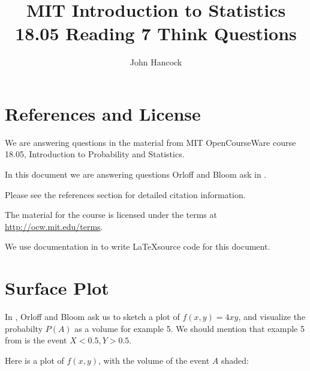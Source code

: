 \documentclass[a4paper,11pt]{article}
\author{John Hancock}
\title{MIT Introduction to Statistics 18.05 Reading 7 Think Questions}
\begin{document}
\maketitle
\tableofcontents
\section{References and License}
We are answering questions in the material from MIT OpenCourseWare
course 18.05, Introduction to Probability and Statistics.

In this document we are answering questions Orloff and Bloom ask in
\cite{reading7}.

Please see the references section for detailed citation information.

The material for the course is licensed under the terms at
\url{http://ocw.mit.edu/terms}.

We use documentation in \cite{threeDFill} to write \LaTeX source code for this document.
\section{Surface Plot}
In \cite{reading7}, Orloff and Bloom ask us
to sketch a plot of $f\left( x,y \right)
= 4xy$, and visualize the probabilty
$P\left(A \right)$ as a volume for example
5.
We should mention that example 5 from
\cite{reading7} is the event
$X < 0.5, Y > 0.5$.

Here is a plot of $f\left( x, y \right)$,
with the volume of the event $A$ shaded:


\begin{center}
\end{center}

\printbibliography{}
\end{document}
